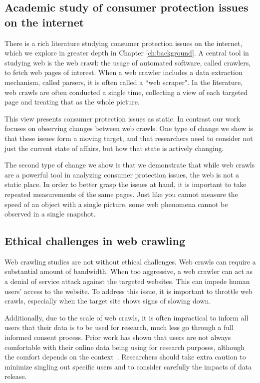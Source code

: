 \subsection{Academic study of consumer protection issues on the internet}
There is a rich literature studying consumer protection issues on the internet, which we explore in greater depth in Chapter \ref{ch:background}. A central tool in studying web is the web crawl: the usage of automated software, called crawlers, to fetch web pages of interest. When a web crawler includes a data extraction mechanism, called parsers, it is often called a ``web scraper". In the literature, web crawls are often conducted a single time, collecting a view of each targeted page and treating that as the whole picture.

This view presents consumer protection issues as static. In contrast our work focuses on observing changes between web crawls. One type of change we show is that these issues form a moving target, and that researchers need to consider not just the current state of affairs, but how that state is actively changing.

The second type of change we show is that we demonstrate that while web crawls are a powerful tool in analyzing consumer protection issues, the web is not a static place. In order to better grasp the issues at hand, it is important to take repeated measurements of the same pages. Just like you cannot measure the speed of an object with a single picture, some web phenomena cannot be observed in a single snapshot.

\subsection{Ethical challenges in web crawling}
Web crawling studies are not without ethical challenges. Web crawls can require a substantial amount of bandwidth. When too aggressive, a web crawler can act as a denial of service attack against the targeted websites. This can impede human users' access to the website. To address this issue, it is important to throttle web crawls, especially when the target site shows signs of slowing down.

Additionally, due to the scale of web crawls, it is often impractical to inform all users that their data is to be used for research, much less go through a full informed consent process. Prior work has shown that users are not always comfortable with their online data being using for research purposes, although the comfort depends on the context~\cite{fiesler2018participant}. Researchers should take extra caution to minimize singling out specific users and to consider carefully the impacts of data release.

